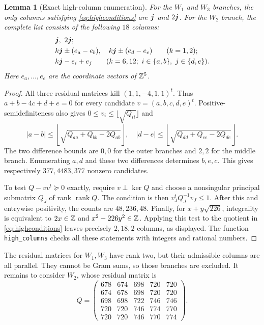 \documentclass[11pt]{article}
\newtheorem{lemma}[theorem]{Lemma}
\theoremstyle{remark}\newtheorem{remark}[theorem]{Remark}
\newcommand{\rk}{\operatorname{rank}}\newcommand{\Gal}{\operatorname{Gal}}
\begin{document}
\begin{lemma}[Exact high-column enumeration]\label{lem:highs}
For the $W_1$ and $W_3$ branches, the only columns satisfying \eqref{eq:highconditions} are $\boldsymbol{j}$ and $2\boldsymbol{j}$. For the $W_2$ branch, the complete list consists of the following $18$ columns:
\begin{align*}
&\boldsymbol{j},\ 2\boldsymbol{j};\\
&k\boldsymbol{j}\pm(e_a-e_b),\quad k\boldsymbol{j}\pm(e_d-e_e)\qquad(k=1,2);\\
&k\boldsymbol{j}-e_i+e_j\qquad(k=6,12;\ i\in\{a,b\},\ j\in\{d,e\}).
\end{align*}
Here $e_a,\ldots,e_e$ are the coordinate vectors of $\mathbb Z^5$.
\end{lemma}
\begin{proof}
All three residual matrices kill $(1,1,-4,1,1)^t$. Thus $a+b-4c+d+e=0$ for every candidate $v=(a,b,c,d,e)^t$. Positive-semidefiniteness also gives $0\le v_i\le\lfloor\sqrt{Q_{ii}}\rfloor$ and
\[
|a-b|\le\left\lfloor\sqrt{Q_{aa}+Q_{bb}-2Q_{ab}}\right\rfloor,\quad
|d-e|\le\left\lfloor\sqrt{Q_{dd}+Q_{ee}-2Q_{de}}\right\rfloor.
\]
The two difference bounds are $0,0$ for the outer branches and $2,2$ for the middle branch. Enumerating $a,d$ and these two differences determines $b,e,c$. This gives respectively $377,4483,377$ nonzero candidates.

To test $Q-vv^t\succeq0$ exactly, require $v\perp\ker Q$ and choose a nonsingular principal submatrix $Q_J$ of rank $\rk Q$. The condition is then $v_J^tQ_J^{-1}v_J\le1$. After this and entrywise positivity, the counts are $48,236,48$. Finally, for $x+y\sqrt{226}$, integrality is equivalent to $2x\in\mathbb Z$ and $x^2-226y^2\in\mathbb Z$. Applying this test to the quotient in \eqref{eq:highconditions} leaves precisely $2,18,2$ columns, as displayed. The function \texttt{high\_columns} checks all these statements with integers and rational numbers.
\end{proof}

The residual matrices for $W_1,W_3$ have rank two, but their admissible columns are all parallel. They cannot be Gram sums, so those branches are excluded. It remains to consider $W_2$, whose residual matrix is
\begin{equation}\label{eq:Qmiddle}
Q=\begin{pmatrix}
678&674&698&720&720\\674&678&698&720&720\\698&698&722&746&746\\720&720&746&774&770\\720&720&746&770&774
\end{pmatrix}.
\end{equation}
\end{document}
